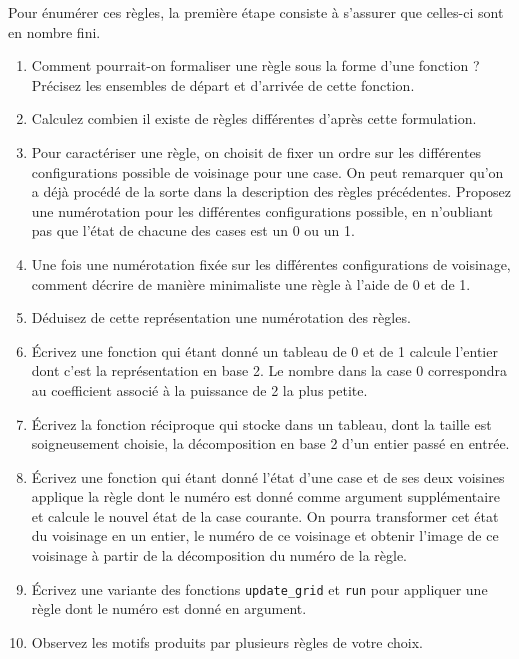 \documentclass[11pt]{article}
\begin{document}
Pour énumérer ces règles, la première étape consiste à s'assurer que celles-ci sont en nombre fini.
\begin{enumerate}
\item Comment pourrait-on formaliser une règle sous la forme d'une fonction ? Précisez les ensembles de départ et d'arrivée de cette fonction.
\item Calculez combien il existe de règles différentes d'après cette formulation.
\item Pour caractériser une règle, on choisit de fixer un ordre sur les différentes configurations possible de voisinage pour une case. On peut remarquer qu'on a déjà procédé de la sorte dans la description des règles précédentes. Proposez une numérotation pour les différentes configurations possible, en n'oubliant pas que l'état de chacune des cases est un 0 ou un 1.
\item Une fois une numérotation fixée sur les différentes configurations de voisinage, comment décrire de manière minimaliste une règle à l'aide de 0 et de 1.
\item Déduisez de cette représentation une numérotation des règles.
\item Écrivez une fonction qui étant donné un tableau de 0 et de 1 calcule l'entier dont c'est la représentation en base 2. Le nombre dans la case 0 correspondra au coefficient associé à la puissance de 2 la plus petite.
\item Écrivez la fonction réciproque qui stocke dans un tableau, dont la taille est soigneusement choisie, la décomposition en base 2 d'un entier passé en entrée.
\item Écrivez une fonction qui étant donné l'état d'une case et de ses deux voisines applique la règle dont le numéro est donné comme argument supplémentaire et calcule le nouvel état de la case courante. On pourra transformer cet état du voisinage en un entier, le numéro de ce voisinage et obtenir l'image de ce voisinage à partir de la décomposition du numéro de la règle.
\item Écrivez une variante des fonctions \texttt{update\_grid} et \texttt{run} pour appliquer une règle dont le numéro est donné en argument.
\item Observez les motifs produits par plusieurs règles de votre choix.
\end{enumerate}
\end{document}
